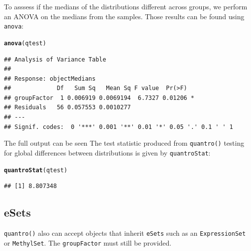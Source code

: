 \documentclass{article}\usepackage[]{graphicx}\usepackage[usenames,dvipsnames]{color}
\makeatletter
\newcommand{\hlstd}[1]{\textcolor[rgb]{0.345,0.345,0.345}{#1}}%
\newcommand{\hlkwd}[1]{\textcolor[rgb]{0.737,0.353,0.396}{\textbf{#1}}}%
\newenvironment{kframe}{%
 \def\at@end@of@kframe{}%
 \ifinner\ifhmode%
  \def\at@end@of@kframe{\end{minipage}}%
  \begin{minipage}{\columnwidth}%
 \fi\fi%
 \def\FrameCommand##1{\hskip\@totalleftmargin \hskip-\fboxsep
 \colorbox{shadecolor}{##1}\hskip-\fboxsep
     \hskip-\linewidth \hskip-\@totalleftmargin \hskip\columnwidth}%
 \MakeFramed {\advance\hsize-\width
   \@totalleftmargin\z@ \linewidth\hsize
   \@setminipage}}%
 {\par\unskip\endMakeFramed%
 \at@end@of@kframe}
\newenvironment{knitrout}{}{} %
\makeatother
\begin{document}
To asssess if the medians of the distributions different across groups, 
we perform an ANOVA on the medians from the samples. Those results can be 
found using \texttt{anova}:

\begin{knitrout}
\color{fgcolor}\begin{kframe}
\begin{alltt}
\hlkwd{anova}\hlstd{(qtest)}
\end{alltt}
\begin{verbatim}
## Analysis of Variance Table
## 
## Response: objectMedians
##             Df   Sum Sq   Mean Sq F value  Pr(>F)  
## groupFactor  1 0.006919 0.0069194  6.7327 0.01206 *
## Residuals   56 0.057553 0.0010277                  
## ---
## Signif. codes:  0 '***' 0.001 '**' 0.01 '*' 0.05 '.' 0.1 ' ' 1
\end{verbatim}
\end{kframe}
\end{knitrout}

The full output can be seen The test statistic produced from 
\texttt{quantro()} testing for global differences between distributions 
is given by \texttt{quantroStat}: 

\begin{knitrout}
\color{fgcolor}\begin{kframe}
\begin{alltt}
\hlkwd{quantroStat}\hlstd{(qtest)}
\end{alltt}
\begin{verbatim}
## [1] 8.807348
\end{verbatim}
\end{kframe}
\end{knitrout}


\subsection{eSets}
\texttt{quantro()} also can accept objects that inherit \texttt{eSets} 
such as an \texttt{ExpressionSet} or \texttt{MethylSet}. The 
\texttt{groupFactor} must still be provided.  
\end{document}
